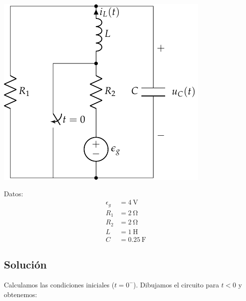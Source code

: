 \documentclass[12pt]{article}
\begin{document}
\begin{minipage}{0.7\textwidth}
  \includegraphics{figs/FM_4_9}
\end{minipage}
\hfill
\begin{minipage}{0.3\textwidth}
  Datos:
  \begin{align*}
    \epsilon_g &= \SI{4}{\volt}\\
    R_1 &= \SI{2}{\ohm}\\
    R_2 &= \SI{2}{\ohm}\\
    L &= \SI{1}{\henry}\\
    C &= \SI{0.25}{\farad}      
  \end{align*}
\end{minipage}

\subsection*{Solución}

Calculamos las condiciones iniciales ($t = 0^-$). Dibujamos el
circuito para $t < 0$ y obtenemos:

\bigskip
\end{document}
